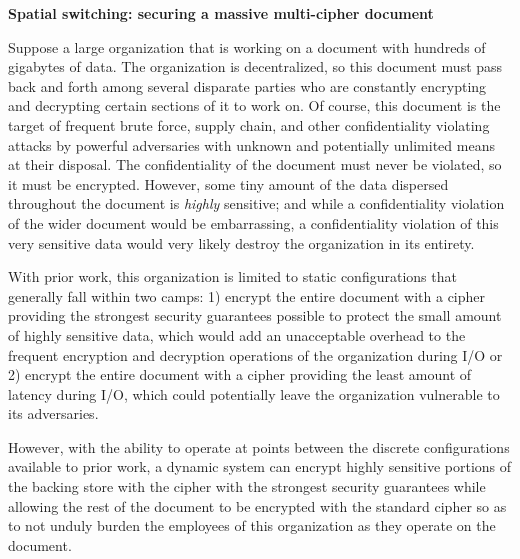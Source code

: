 \noindent
\textbf{Spatial switching: securing a massive multi-cipher document}

Suppose a large organization that is working on a document with hundreds of
gigabytes of data. The organization is decentralized, so this document must pass
back and forth among several disparate parties who are constantly encrypting and
decrypting certain sections of it to work on. Of course, this document is the
target of frequent brute force, supply chain, and other confidentiality
violating attacks by powerful adversaries with unknown and potentially unlimited
means at their disposal. The confidentiality of the document must never be
violated, so it must be encrypted. However, some tiny amount of the data
dispersed throughout the document is \emph{highly} sensitive; and while a
confidentiality violation of the wider document would be embarrassing, a
confidentiality violation of this very sensitive data would very likely destroy
the organization in its entirety.

With prior work, this organization is limited to static configurations that
generally fall within two camps: 1) encrypt the entire document with a cipher
providing the strongest security guarantees possible to protect the small amount
of highly sensitive data, which would add an unacceptable overhead to the
frequent encryption and decryption operations of the organization during I/O or
2) encrypt the entire document with a cipher providing the least amount of
latency during I/O, which could potentially leave the organization vulnerable to
its adversaries.

However, with the ability to operate at points between the discrete
configurations available to prior work, a dynamic system can encrypt highly
sensitive portions of the backing store with the cipher with the strongest
security guarantees while allowing the rest of the document to be encrypted with
the standard cipher so as to not unduly burden the employees of this
organization as they operate on the document.
